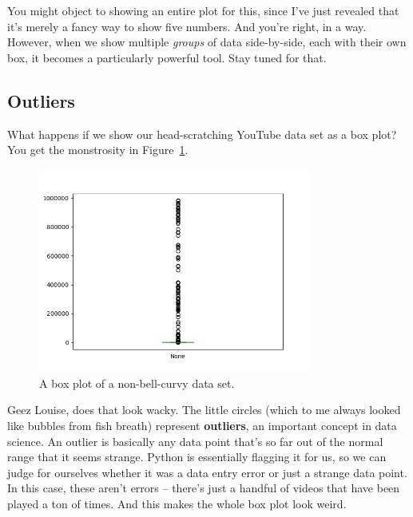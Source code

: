 You might object to showing an entire plot for this, since I've just revealed
that it's merely a fancy way to show five numbers. And you're right, in a way.
However, when we show multiple \textit{groups} of data side-by-side, each with
their own box, it becomes a particularly powerful tool. Stay tuned for that.

\subsection{Outliers}

What happens if we show our head-scratching YouTube data set as a box plot? You
get the monstrosity in Figure~\ref{fig:youtubebox}.

\begin{figure}[ht]
\centering
\includegraphics[width=0.8\textwidth]{youtubebox.png}
\caption{A box plot of a non-bell-curvy data set.}
\label{fig:youtubebox}
\end{figure}


Geez Louise, does that look wacky. The little circles (which to me always
looked like bubbles from fish breath) represent \textbf{outliers}, an important
concept in data science. An outlier is basically any data point that's so far
out of the normal range that it seems strange. Python is essentially flagging
it for us, so we can judge for ourselves whether it was a data entry error or
just a strange data point. In this case, these aren't errors -- there's just a
handful of videos that have been played a ton of times. And this makes the
whole box plot look weird.


